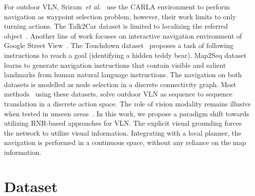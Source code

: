 \documentclass[letterpaper, 10 pt, conference]{ieeeconf}  %
\newcommand{\etal}{\textit{et al.}}
\begin{document}
For outdoor VLN, Sriram~\etal~\cite{sriram2019talk} use the CARLA environment to perform navigation as waypoint selection problem, however, their work limits to only turning actions. The Talk2Car dataset is limited to localizing the referred object~\cite{deruyttere2019talk2car}. Another line of work focuses on interactive navigation environment of Google Street View~\cite{mirowski2018learning}. The Touchdown dataset~\cite{chen2019touchdown} proposes a task of following instructions to reach a goal (identifying a hidden teddy bear). Map2Seq dataset~\cite{schumann2020generating} learns to generate navigation instructions that contain visible and salient landmarks from human natural language instructions. The navigation on both datasets is modelled as node selection in a discrete connectivity graph. Most methods~\cite{schumann-riezler-2022-analyzing,zhu-etal-2021-multimodal,xiang-etal-2020-learning} using these datasets, solve outdoor VLN as sequence to sequence translation in a discrete action space. The role of vision modality remains illusive when tested in unseen areas~\cite{schumann-riezler-2022-analyzing}. In this work, we propose a paradigm shift towards utilizing RNR-based approaches for VLN. The explicit visual grounding forces the network to utilize visual information. Integrating with a local planner, the navigation is performed in a continuous space, without any reliance on the map information. 

\section{Dataset}

\end{document}
